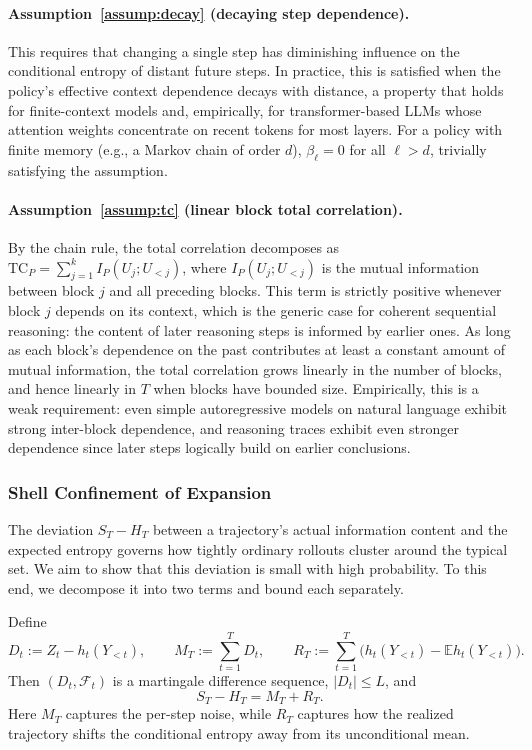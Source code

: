 \paragraph{Assumption~\ref{assump:decay} (decaying step dependence).} This requires that changing a single step has diminishing influence on the conditional entropy of distant future steps. In practice, this is satisfied when the policy's effective context dependence decays with distance, a property that holds for finite-context models and, empirically, for transformer-based LLMs whose attention weights concentrate on recent tokens for most layers. For a policy with finite memory (e.g., a Markov chain of order $d$), $\beta_\ell = 0$ for all $\ell > d$, trivially satisfying the assumption.

\paragraph{Assumption~\ref{assump:tc} (linear block total correlation).} By the chain rule, the total correlation decomposes as $\mathrm{TC}_P = \sum_{j=1}^k I_P(U_j; U_{<j})$, where $I_P(U_j; U_{<j})$ is the mutual information between block $j$ and all preceding blocks. This term is strictly positive whenever block $j$ depends on its context, which is the generic case for coherent sequential reasoning: the content of later reasoning steps is informed by earlier ones. As long as each block's dependence on the past contributes at least a constant amount of mutual information, the total correlation grows linearly in the number of blocks, and hence linearly in $T$ when blocks have bounded size. Empirically, this is a weak requirement: even simple autoregressive models on natural language exhibit strong inter-block dependence, and reasoning traces exhibit even stronger dependence since later steps logically build on earlier conclusions.

\subsubsection{Shell Confinement of Expansion}

The deviation $S_T - H_T$ between a trajectory's actual information content and the expected entropy governs how tightly ordinary rollouts cluster around the typical set. We aim to show that this deviation is small with high probability. To this end, we decompose it into two terms and bound each separately.

\begin{lemma}
\label{lem:decomp}
Define
\begin{equation}
  D_t:=Z_t-h_t(Y_{<t}),
  \qquad
  M_T:=\sum_{t=1}^{T}D_t,
  \qquad
  R_T:=\sum_{t=1}^{T}\big(h_t(Y_{<t})-\mathbb{E}h_t(Y_{<t})\big).
\end{equation}
Then $(D_t,\mathcal{F}_t)$ is a martingale difference sequence, $|D_t|\le L$, and
\begin{equation}
  S_T-H_T=M_T+R_T.
  \label{eq:martingale-decomp}
\end{equation}
Here $M_T$ captures the per-step noise, while $R_T$ captures how the realized trajectory shifts the conditional entropy away from its unconditional mean.
\end{lemma}

